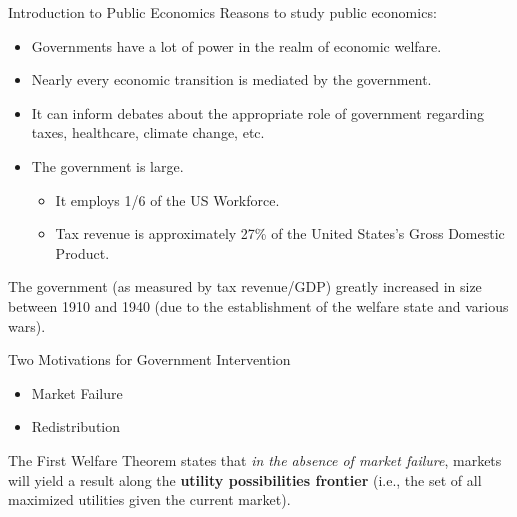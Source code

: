 \documentclass[10pt]{extarticle}
\begin{document}
\begin{problem}{Introduction to Public Economics}
   Reasons to study public economics:
    \begin{itemize}
      \item Governments have a lot of power in the realm of economic welfare.
      \item Nearly every economic transition is mediated by the government.
      \item It can inform debates about the appropriate role of government regarding taxes, healthcare, climate change, etc.
      \item The government is large.
        \begin{itemize}
          \item It employs 1/6 of the US Workforce.
          \item Tax revenue is approximately 27\% of the United States's Gross Domestic Product.
        \end{itemize}
    \end{itemize}
    The government (as measured by tax revenue/GDP) greatly increased in size between 1910 and 1940 (due to the establishment of the welfare state and various wars).
    \begin{center}
    \end{center}
    \begin{problem}{Two Motivations for Government Intervention}
      \begin{itemize}
        \item Market Failure
        \item Redistribution
      \end{itemize}
      The First Welfare Theorem states that \textit{in the absence of market failure}, markets will yield a result along the \textbf{utility possibilities frontier} (i.e., the set of all maximized utilities given the current market).


\end{problem}
\end{problem}
\end{document}
